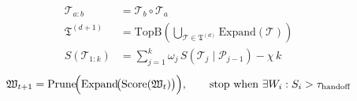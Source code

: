\begin{align}
\mathcal{T}_{a:b} &= \mathcal{T}_b \circ \mathcal{T}_a \\[6pt]
\mathfrak{T}^{(d+1)} &= \mathrm{TopB}\!\left(\bigcup_{\mathcal{T}\in\mathfrak{T}^{(d)}}\mathrm{Expand}(\mathcal{T})\right) \\[6pt]
S(\mathcal{T}_{1:k}) &= \sum_{j=1}^{k}\omega_j\,S(\mathcal{T}_j \mid \mathcal{P}_{j-1}) - \chi\,k
\end{align}
\begin{equation}
\mathfrak{W}_{t+1} = \mathrm{Prune}\!\Bigl(\mathrm{Expand}\!\bigl(\mathrm{Score}(\mathfrak{W}_t)\bigr)\Bigr), \qquad \text{stop when } \exists W_i : S_i > \tau_{\text{handoff}}
\end{equation}
